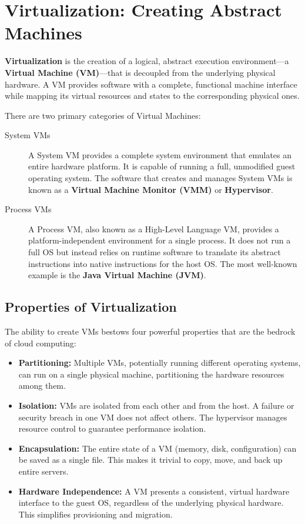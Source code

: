 \section{Virtualization: Creating Abstract Machines}

\textbf{Virtualization} is the creation of a logical, abstract execution environment—a \textbf{Virtual Machine (VM)}—that is decoupled from the underlying physical hardware. A VM provides software with a complete, functional machine interface while mapping its virtual resources and states to the corresponding physical ones.

There are two primary categories of Virtual Machines:
\begin{description}
    \item[System VMs] A System VM provides a complete system environment that emulates an entire hardware platform. It is capable of running a full, unmodified guest operating system. The software that creates and manages System VMs is known as a \textbf{Virtual Machine Monitor (VMM)} or \textbf{Hypervisor}.
    \item[Process VMs] A Process VM, also known as a High-Level Language VM, provides a platform-independent environment for a single process. It does not run a full OS but instead relies on runtime software to translate its abstract instructions into native instructions for the host OS. The most well-known example is the \textbf{Java Virtual Machine (JVM)}.
\end{description}

\subsection{Properties of Virtualization}
The ability to create VMs bestows four powerful properties that are the bedrock of cloud computing:
\begin{itemize}
    \item \textbf{Partitioning:} Multiple VMs, potentially running different operating systems, can run on a single physical machine, partitioning the hardware resources among them.
    \item \textbf{Isolation:} VMs are isolated from each other and from the host. A failure or security breach in one VM does not affect others. The hypervisor manages resource control to guarantee performance isolation.
    \item \textbf{Encapsulation:} The entire state of a VM (memory, disk, configuration) can be saved as a single file. This makes it trivial to copy, move, and back up entire servers.
    \item \textbf{Hardware Independence:} A VM presents a consistent, virtual hardware interface to the guest OS, regardless of the underlying physical hardware. This simplifies provisioning and migration.
\end{itemize}

